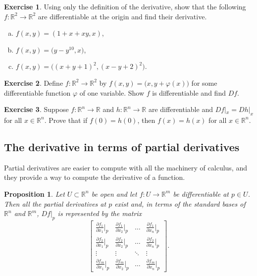\documentclass[12pt,openany]{book}
\newcommand{\R}{{\mathbb{R}}}
\theoremstyle{plain}
\newtheorem{prop}[thm]{Proposition}
\theoremstyle{remark}
\theoremstyle{definition}
\newenvironment{exbox}{%
    \def\FrameCommand{\vrule width 1pt \relax\hspace{10pt}}%
    \MakeFramed{\advance\hsize-\width\FrameRestore}%
}{%
    \endMakeFramed
}
\newenvironment{exparts}{%
    \leavevmode\begin{enumerate}[a),noitemsep,topsep=0pt,parsep=0pt,partopsep=0pt]
}{%
    \end{enumerate}
}
\theoremstyle{exercise}
\newtheorem{exercise}{Exercise}[section]
\theoremstyle{example}
\begin{document}
\begin{exbox}
\begin{exercise}
Using only the definition of the derivative, show that
the following $f \colon \R^2 \to \R^2$ are differentiable at the origin and
find their derivative.
\begin{exparts}
\item
$f(x,y) = (1+x+xy,x)$,
\item
$f(x,y) = \bigl(y-y^{10},x \bigr)$,
\item
$f(x,y) = \bigl( {(x+y+1)}^2 , {(x-y+2)}^2 \bigr)$.
\end{exparts}
\end{exercise}

\begin{exercise}
Define $f \colon \R^2 \to \R^2$ by $f(x,y) =
\bigl(x,y+\varphi(x)\bigr)$ for some differentiable function $\varphi$ of one
variable.  Show $f$ is differentiable and find $Df$.
\end{exercise}

\begin{exercise}
Suppose $f \colon \R^n \to \R$ and $h \colon \R^n \to \R$ are 
differentiable and $Df|_x = Dh|_x$ for all $x \in \R^n$.
Prove that
if $f(0) = h(0)$, then $f(x) = h(x)$ for all $x \in \R^n$.
\end{exercise}
\end{exbox}


\subsection{The derivative in terms of partial derivatives}

Partial derivatives are easier to compute with all the machinery of
calculus, and they provide a way to compute the derivative of a
function.

\begin{prop} \label{mv:prop:jacobianmatrix}
Let $U \subset \R^n$ be open and let $f \colon U \to \R^m$ be
differentiable at $p \in U$.  Then all the partial derivatives at $p$
exist and, in terms of the standard bases of $\R^n$ and $\R^m$,
$Df|_p$ is represented by the matrix
\begin{equation*}
\begin{bmatrix}
\frac{\partial f_1}{\partial x_1}\big|_p
&
\frac{\partial f_1}{\partial x_2}\big|_p
& \ldots &
\frac{\partial f_1}{\partial x_n}\big|_p
\\[6pt]
\frac{\partial f_2}{\partial x_1}\big|_p
&
\frac{\partial f_2}{\partial x_2}\big|_p
& \ldots &
\frac{\partial f_2}{\partial x_n}\big|_p
\\
\vdots & \vdots & \ddots & \vdots
\\
\frac{\partial f_m}{\partial x_1}\big|_p
&
\frac{\partial f_m}{\partial x_2}\big|_p
& \ldots &
\frac{\partial f_m}{\partial x_n}\big|_p
\end{bmatrix} .
\end{equation*}
\end{prop}
\end{document}

